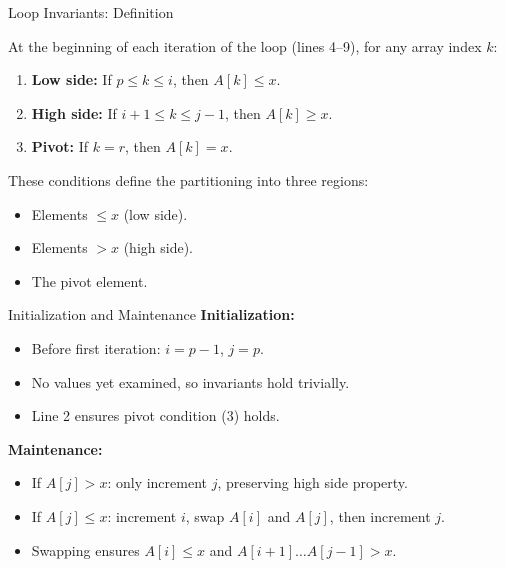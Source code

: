 \documentclass{beamer}
\begin{document}
\begin{frame}{Loop Invariants: Definition}
    \begin{center}
    \end{center}
    At the beginning of each iteration of the loop (lines 4--9), for any array index $k$:
    \begin{enumerate}
        \item \textbf{Low side:} If $p \leq k \leq i$, then $A[k] \leq x$.
        \item \textbf{High side:} If $i+1 \leq k \leq j-1$, then $A[k] \geq x$.
        \item \textbf{Pivot:} If $k = r$, then $A[k] = x$.
    \end{enumerate}
    These conditions define the partitioning into three regions:
    \begin{itemize}
        \item Elements $\leq x$ (low side).
        \item Elements $> x$ (high side).
        \item The pivot element.
    \end{itemize}
\end{frame}

\begin{frame}{Initialization and Maintenance}
    \textbf{Initialization:}
    \begin{itemize}
        \item Before first iteration: $i = p-1$, $j = p$.
        \item No values yet examined, so invariants hold trivially.
        \item Line 2 ensures pivot condition (3) holds.
    \end{itemize}
    \textbf{Maintenance:}
    \begin{itemize}
        \item If $A[j] > x$: only increment $j$, preserving high side property.
        \item If $A[j] \leq x$: increment $i$, swap $A[i]$ and $A[j]$, then increment $j$.
        \item Swapping ensures $A[i] \leq x$ and $A[i+1] \dots A[j-1] > x$.
    \end{itemize}
\end{frame}
\end{document}
